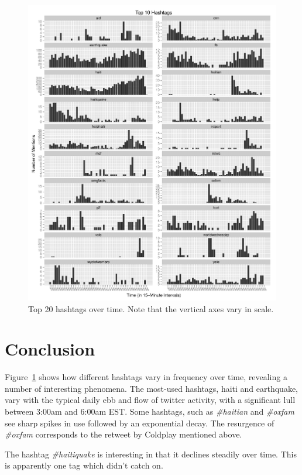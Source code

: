 \documentclass[a4paper, 11pt, titlepage]{article}
\begin{document}
\begin{figure}[h]
\centering
\includegraphics[width=\textwidth]{../figures/top-20-hashtags.pdf}
\caption{Top 20 hashtags over time. Note that the vertical axes vary in scale.}
\label{fig:hashtag_counts_over_time}
\end{figure}
\section{Conclusion}

Figure~\ref{fig:hashtag_counts_over_time} shows how different hashtags vary in frequency over time, revealing a number of interesting phenomena. The most-used hashtags, haiti and earthquake, vary with the typical daily ebb and flow of twitter activity, with a significant lull  between 3:00am and 6:00am EST. Some hashtags, such as \textit{\#haitian} and \textit{\#oxfam} see sharp spikes in use followed by an exponential decay. The resurgence of \textit{\#oxfam} corresponds to the retweet by Coldplay mentioned above.

The hashtag \textit{\#haitiquake} is interesting in that it declines steadily over time. This is apparently one tag which didn't catch on.
\end{document}
